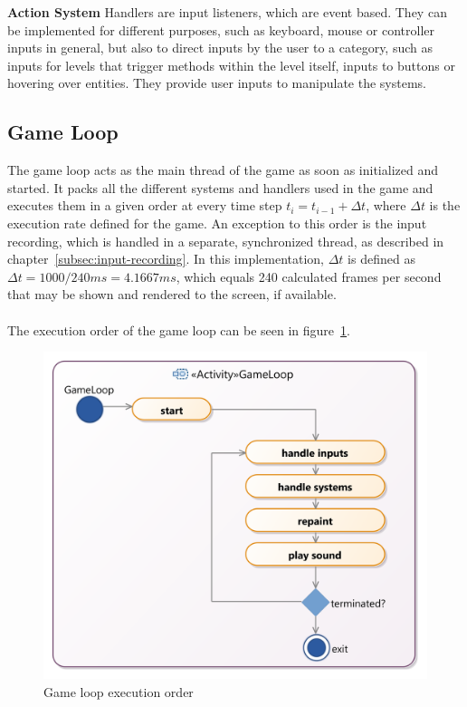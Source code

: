 \textbf{Action System}
Handlers are input listeners, which are event based.
They can be implemented for different purposes, such as keyboard, mouse or controller inputs in general, but also to direct inputs by the user
to a category, such as inputs for levels that trigger methods within the level itself, inputs to buttons or hovering over entities.
They provide user inputs to manipulate the systems. 

\subsection{Game Loop}\label{subsec:game-loop}
The game loop acts as the main thread of the game as soon as initialized and started.
It packs all the different systems and handlers used in the game and executes them in a given order at every time step
$t_{i} = t_{i-1} + \Delta t$, where $\Delta t$ is the execution rate defined for the game.
An exception to this order is the input recording, which is handled in a separate, synchronized thread, as described in chapter~\ref{subsec:input-recording}.
In this implementation, $\Delta t$ is defined as $\Delta t = 1000 / 240 ms = 4.1667 ms$, which equals 240 calculated frames per second that may be shown and rendered
to the screen, if available.
\\ \\
The execution order of the game loop can be seen in figure~\ref{fig:gameloop-process}.
\begin{figure}
    \centering
    \includegraphics[width=\textwidth]{Pictures/res/implementation/gameloop-process}
    \caption{Game loop execution order}
    \label{fig:gameloop-process}
\end{figure}

